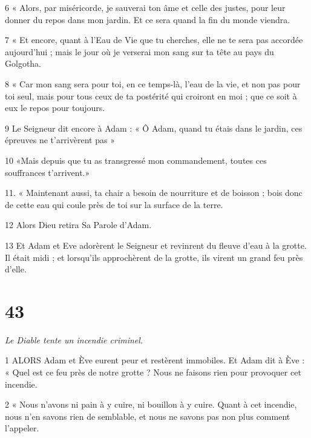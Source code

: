 \par 6 « Alors, par miséricorde, je sauverai ton âme et celle des justes, pour leur donner du repos dans mon jardin. Et ce sera quand la fin du monde viendra.

\par 7 « Et encore, quant à l'Eau de Vie que tu cherches, elle ne te sera pas accordée aujourd'hui ; mais le jour où je verserai mon sang sur ta tête au pays du Golgotha.

\par 8 « Car mon sang sera pour toi, en ce temps-là, l'eau de la vie, et non pas pour toi seul, mais pour tous ceux de ta postérité qui croiront en moi ; que ce soit à eux le repos pour toujours.

\par 9 Le Seigneur dit encore à Adam : « Ô Adam, quand tu étais dans le jardin, ces épreuves ne t'arrivèrent pas »

\par 10 «Mais depuis que tu as transgressé mon commandement, toutes ces souffrances t'arrivent.»

\par 11. « Maintenant aussi, ta chair a besoin de nourriture et de boisson ; bois donc de cette eau qui coule près de toi sur la surface de la terre.

\par 12 Alors Dieu retira Sa Parole d'Adam.

\par 13 Et Adam et Eve adorèrent le Seigneur et revinrent du fleuve d'eau à la grotte. Il était midi ; et lorsqu'ils approchèrent de la grotte, ils virent un grand feu près d'elle.

\chapter{43}

\par \textit{Le Diable tente un incendie criminel.}

\par 1 ALORS Adam et Ève eurent peur et restèrent immobiles. Et Adam dit à Ève : « Quel est ce feu près de notre grotte ? Nous ne faisons rien pour provoquer cet incendie.

\par 2 « Nous n'avons ni pain à y cuire, ni bouillon à y cuire. Quant à cet incendie, nous n’en savons rien de semblable, et nous ne savons pas non plus comment l’appeler.

